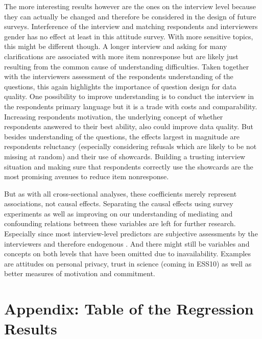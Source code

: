 \documentclass[a4paper,12pt]{article}
\begin{document}
The more interesting results however are the ones on the interview level because they can actually be changed and therefore be considered in the design of future surveys. Interference of the interview and matching respondents and interviewers gender has no effect at least in this attitude survey. With more sensitive topics, this might be different though. A longer interview and asking for many clarifications are associated with more item nonresponse but are likely just resulting from the common cause of understanding difficulties. Taken together with the interviewers assessment of the respondents understanding of the questions, this again highlights the importance of question design for data quality. One possibility to improve understanding is to conduct the interview in the respondents primary language but it is a trade with costs and comparability. Increasing respondents motivation, the underlying concept of whether respondents answered to their best ability, also could improve data quality. But besides understanding of the questions, the effects largest in magnitude are respondents reluctancy (especially considering refusals which are likely to be not missing at random) and their use of showcards. Building a trusting interview situation and making sure that respondents correctly use the showcards are the most promising avenues to reduce item nonresponse.

But as with all cross-sectional analyses, these coefficients merely represent associations, not causal effects. Separating the causal effects using survey experiments as well as improving on our understanding of mediating and confounding relations between these variables are left for further research. Especially since most interview-level predictors are subjective assessments by the interviewers and therefore endogenous \citep[8]{silberEffectsQuestionRespondent2021}. And there might still be variables and concepts on both levels that have been omitted due to inavailability. Examples are attitudes on personal privacy, trust in science (coming in ESS10) as well as better measures of motivation and commitment.


\printbibliography

\section*{Appendix: Table of the Regression Results}
\small

\end{document}
